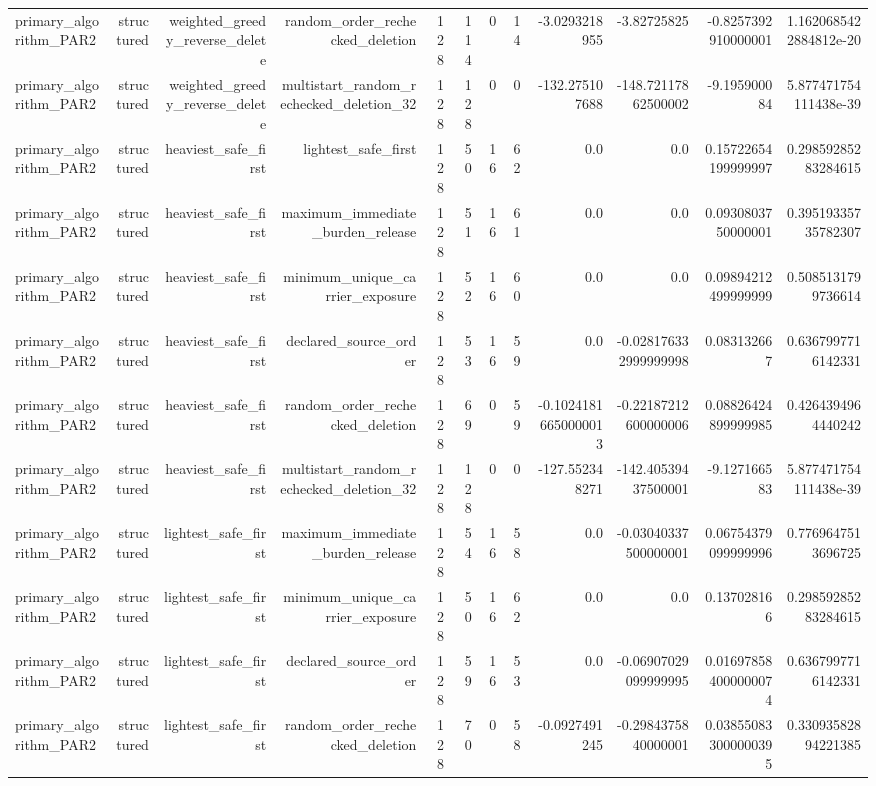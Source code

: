 {\begin{longtable}{lrrrrrrrrrrr}
primary\_algorithm\_PAR2 & structured & weighted\_greedy\_reverse\_delete & random\_order\_rechecked\_deletion & 128 & 114 & 0 & 14 & -3.0293218955 & -3.82725825 & -0.8257392910000001 & 1.1620685422884812e-20 \\
primary\_algorithm\_PAR2 & structured & weighted\_greedy\_reverse\_delete & multistart\_random\_rechecked\_deletion\_32 & 128 & 128 & 0 & 0 & -132.275107688 & -148.72117862500002 & -9.195900084 & 5.877471754111438e-39 \\
primary\_algorithm\_PAR2 & structured & heaviest\_safe\_first & lightest\_safe\_first & 128 & 50 & 16 & 62 & 0.0 & 0.0 & 0.15722654199999997 & 0.29859285283284615 \\
primary\_algorithm\_PAR2 & structured & heaviest\_safe\_first & maximum\_immediate\_burden\_release & 128 & 51 & 16 & 61 & 0.0 & 0.0 & 0.0930803750000001 & 0.39519335735782307 \\
primary\_algorithm\_PAR2 & structured & heaviest\_safe\_first & minimum\_unique\_carrier\_exposure & 128 & 52 & 16 & 60 & 0.0 & 0.0 & 0.09894212499999999 & 0.5085131799736614 \\
primary\_algorithm\_PAR2 & structured & heaviest\_safe\_first & declared\_source\_order & 128 & 53 & 16 & 59 & 0.0 & -0.028176332999999998 & 0.083132667 & 0.6367997716142331 \\
primary\_algorithm\_PAR2 & structured & heaviest\_safe\_first & random\_order\_rechecked\_deletion & 128 & 69 & 0 & 59 & -0.10241816650000013 & -0.22187212600000006 & 0.08826424899999985 & 0.4264394964440242 \\
primary\_algorithm\_PAR2 & structured & heaviest\_safe\_first & multistart\_random\_rechecked\_deletion\_32 & 128 & 128 & 0 & 0 & -127.552348271 & -142.40539437500001 & -9.127166583 & 5.877471754111438e-39 \\
primary\_algorithm\_PAR2 & structured & lightest\_safe\_first & maximum\_immediate\_burden\_release & 128 & 54 & 16 & 58 & 0.0 & -0.03040337500000001 & 0.06754379099999996 & 0.7769647513696725 \\
primary\_algorithm\_PAR2 & structured & lightest\_safe\_first & minimum\_unique\_carrier\_exposure & 128 & 50 & 16 & 62 & 0.0 & 0.0 & 0.137028166 & 0.29859285283284615 \\
primary\_algorithm\_PAR2 & structured & lightest\_safe\_first & declared\_source\_order & 128 & 59 & 16 & 53 & 0.0 & -0.06907029099999995 & 0.016978584000000074 & 0.6367997716142331 \\
primary\_algorithm\_PAR2 & structured & lightest\_safe\_first & random\_order\_rechecked\_deletion & 128 & 70 & 0 & 58 & -0.0927491245 & -0.2984375840000001 & 0.038550833000000395 & 0.33093582894221385 \\

\end{longtable}}
